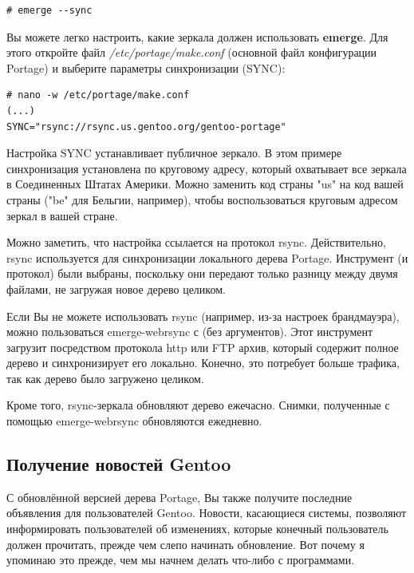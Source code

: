 \documentclass[10pt]{book}
\begin{document}
\begin{tcolorbox}
\begin{lstlisting}
# emerge --sync
\end{lstlisting}
\end{tcolorbox}

Вы можете легко настроить, какие зеркала должен использовать  \textbf{emerge}. Для этого откройте файл \textit{/etc/portage/make.conf} (основной файл конфигурации Portage) и выберите параметры синхронизации (SYNC):

\begin{tcolorbox}
\begin{lstlisting}
# nano -w /etc/portage/make.conf
(...)
SYNC="rsync://rsync.us.gentoo.org/gentoo-portage"
\end{lstlisting}
\end{tcolorbox}

Настройка SYNC устанавливает публичное зеркало. В этом примере синхронизация установлена по круговому адресу, который охватывает все зеркала в Соединенных Штатах Америки. Можно заменить код страны "us" на код вашей страны ("be" для Бельгии, например), чтобы воспользоваться круговым адресом зеркал в вашей стране.

Можно заметить, что настройка ссылается на протокол rsync. Действительно, rsync используется для синхронизации локального дерева Portage. Инструмент (и протокол) были выбраны, поскольку они передают только разницу между двумя файлами, не загружая новое дерево целиком.

Если Вы не можете использовать rsync (например, из-за настроек брандмауэра), можно пользоваться emerge-webrsync с (без аргументов). Этот инструмент загрузит посредством протокола http или FTP архив, который содержит полное дерево и синхронизирует его локально. Конечно, это потребует больше трафика, так как дерево было загружено целиком.

Кроме того, rsync-зеркала обновляют дерево ежечасно. Снимки, полученные с помощью emerge-webrsync обновляются ежедневно.

\subsection{Получение новостей Gentoo}

С обновлённой версией дерева Portage, Вы также получите последние объявления для пользователей Gentoo.
Новости, касающиеся системы, позволяют информировать пользователей об изменениях, которые конечный пользователь должен прочитать, прежде чем слепо начинать обновление. Вот почему я упоминаю это прежде, чем мы начнем делать что-либо с программами.
\end{document}
